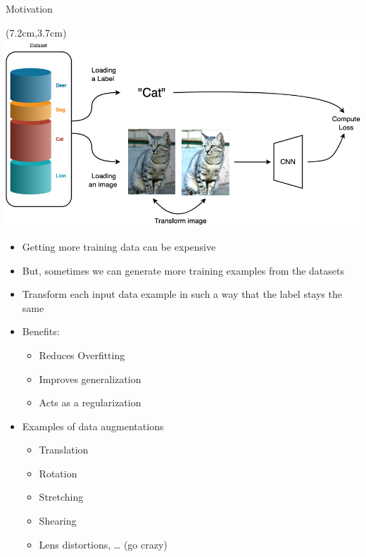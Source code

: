 \documentclass[serif, aspectratio=169]{beamer}
\begin{document}
\begin{frame}{Motivation}
	\begin{textblock*}{5cm}(7.2cm,3.7cm) %
		\includegraphics[keepaspectratio, scale=0.28]{pic/cnnaug}
	\end{textblock*}
	
	\begin{itemize}
		\item Getting more training data can be expensive
		\item But, sometimes we can generate more training examples from the datasets
		\item Transform each input data example in such a way that the label stays the same
		\item Benefits:
		\begin{itemize}
			\item Reduces Overfitting 
			\item Improves generalization
			\item Acts as a regularization
		\end{itemize}
		\item Examples of data augmentations
		\begin{itemize}
			\item Translation
			\item Rotation
			\item Stretching
			\item Shearing
			\item Lens distortions, … (go crazy)
		\end{itemize}
	\end{itemize}
\end{frame}
\end{document}
